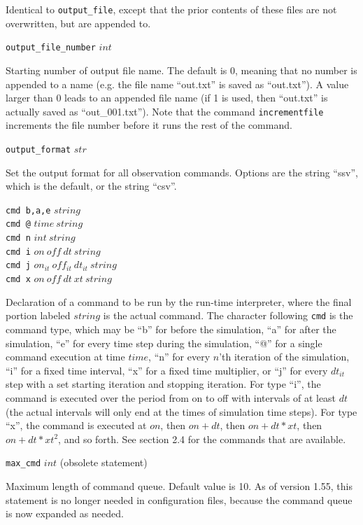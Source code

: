 \documentclass {scrbook}
\newcommand {\ttt} {\texttt}
\begin{document}
\begin{description}
Identical to \ttt{output\_file}, except that the prior contents of these files are not overwritten, but are appended to.

\item{\ttt{output\_file\_number} $int$}

Starting number of output file name. The default is 0, meaning that no number is appended to a name (e.g. the file name ``out.txt'' is saved as ``out.txt''). A value larger than 0 leads to an appended file name (if 1 is used, then ``out.txt'' is actually saved as ``out\_001.txt''). Note that the command \ttt{incrementfile} increments the file number before it runs the rest of the command.

\item{\ttt{output\_format} $str$}

Set the output format for all observation commands. Options are the string ``ssv'', which is the default, or the string ``csv''.

\item{\ttt{cmd b,a,e} $string$\\
\ttt{cmd @} $time\ string$\\
\ttt{cmd n} $int\ string$\\
\ttt{cmd i} $on\ off\ dt\ string$\\
\ttt{cmd j} $on_{it}\ off_{it}\ dt_{it}\ string$\\
\ttt{cmd x} $on\ off\ dt\ xt\ string$}

Declaration of a command to be run by the run-time interpreter, where the final portion labeled $string$ is the actual command. The character following \ttt{cmd} is the command type, which may be ``b'' for before the simulation, ``a'' for after the simulation, ``e'' for every time step during the simulation, ``@'' for a single command execution at time $time$, ``n'' for every $n$'th iteration of the simulation, ``i'' for a fixed time interval, ``x'' for a fixed time multiplier, or ``j'' for every $dt_{it}$ step with a set starting iteration and stopping iteration. For type ``i'', the command is executed over the period from on to off with intervals of at least $dt$ (the actual intervals will only end at the times of simulation time steps). For type ``x'', the command is executed at $on$, then $on+dt$, then $on+dt*xt$, then $on+dt*xt^2$, and so forth. See section 2.4 for the commands that are available.

\item{\ttt{max\_cmd} $int$ (obsolete statement)}

Maximum length of command queue. Default value is 10. As of version 1.55, this statement is no longer needed in configuration files, because the command queue is now expanded as needed.

\end{description}
\end{document}
